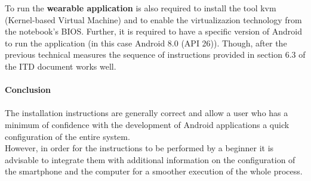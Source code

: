 To run the \textbf{wearable application} is also required to install the tool kvm (Kernel-based Virtual Machine) and to enable the virtualizazion technology from the notebook's BIOS. Further, it is required to have a specific version of Android to run the application (in this case Android 8.0 (API 26)). Though, after the previous technical measures the sequence of instructions provided in section 6.3 of the ITD document works well.\\\\
\textbf{Conclusion}\\\\
The installation instructions are generally correct and allow a user who has a minimum of confidence with the development of Android applications a quick configuration of the entire system.\\
However, in order for the instructions to be performed by a beginner it is advisable to integrate them with additional information on the configuration of the smartphone and the computer for a smoother execution of the whole process.
